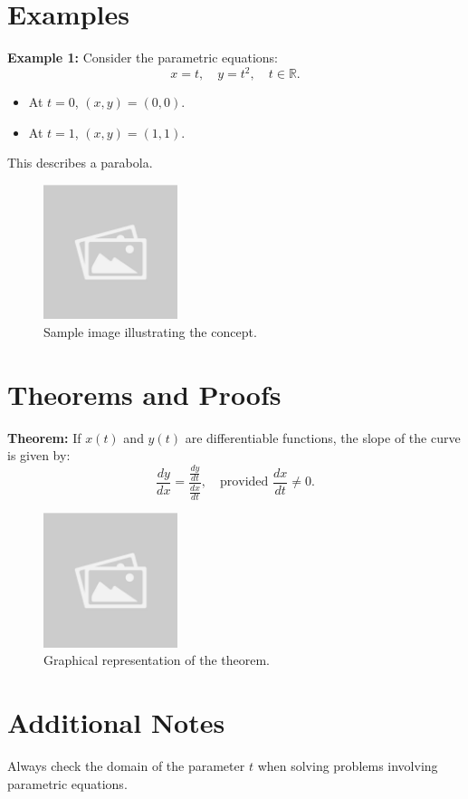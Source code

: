 \documentclass{article}
\begin{document}
\section*{Examples}
\begin{examplebox}
\textbf{Example 1:} Consider the parametric equations:
\[ x = t, \quad y = t^2, \quad t \in \mathbb{R}. \]
\begin{itemize}
    \item At $t = 0$, $(x, y) = (0, 0)$.
    \item At $t = 1$, $(x, y) = (1, 1)$.
\end{itemize}
This describes a parabola.

\begin{figure}[H]
    \centering
    \includegraphics[width=0.35\textwidth]{sample_image.jpg}
    \caption{Sample image illustrating the concept.}
    \label{fig:sample_image}
\end{figure}

\end{examplebox}

\section*{Theorems and Proofs}
\begin{theorembox}
\textbf{Theorem:} If $x(t)$ and $y(t)$ are differentiable functions, the slope of the curve is given by:
\[ \frac{dy}{dx} = \frac{\frac{dy}{dt}}{\frac{dx}{dt}}, \quad \text{provided } \frac{dx}{dt} \neq 0. \]

\begin{figure}[H]
    \centering
    \includegraphics[width=0.35\textwidth]{sample_image1.jpg}
    \caption{Graphical representation of the theorem.}
    \label{fig:sample_image1}
\end{figure}

\end{theorembox}

\section*{Additional Notes}
\begin{notebox}
Always check the domain of the parameter $t$ when solving problems involving parametric equations.
\end{notebox}
\end{document}
